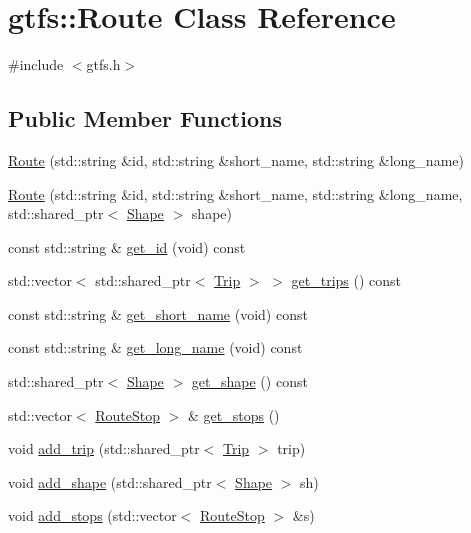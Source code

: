 \hypertarget{classgtfs_1_1Route}{}\section{gtfs\+:\+:Route Class Reference}
\label{classgtfs_1_1Route}


{\ttfamily \#include $<$gtfs.\+h$>$}

\subsection*{Public Member Functions}
\begin{DoxyCompactItemize}
\item 
\hyperlink{classgtfs_1_1Route_a32550fdfee780a26c596172184b86148}{Route} (std\+::string \&id, std\+::string \&short\+\_\+name, std\+::string \&long\+\_\+name)
\item 
\hyperlink{classgtfs_1_1Route_aa216efacee7f9eeab810e044894d3ec0}{Route} (std\+::string \&id, std\+::string \&short\+\_\+name, std\+::string \&long\+\_\+name, std\+::shared\+\_\+ptr$<$ \hyperlink{classgtfs_1_1Shape}{Shape} $>$ shape)
\item 
const std\+::string \& \hyperlink{classgtfs_1_1Route_a3f3f9bfc3a0aefbc96bc4488571e20f8}{get\+\_\+id} (void) const 
\item 
std\+::vector$<$ std\+::shared\+\_\+ptr$<$ \hyperlink{classgtfs_1_1Trip}{Trip} $>$ $>$ \hyperlink{classgtfs_1_1Route_a5ace58195fe71103e342e517fa1f92ca}{get\+\_\+trips} () const 
\item 
const std\+::string \& \hyperlink{classgtfs_1_1Route_a4834b2eb8f3221b435dead80ed9ec09b}{get\+\_\+short\+\_\+name} (void) const 
\item 
const std\+::string \& \hyperlink{classgtfs_1_1Route_adb91353a8a7d69027b252e67c529081d}{get\+\_\+long\+\_\+name} (void) const 
\item 
std\+::shared\+\_\+ptr$<$ \hyperlink{classgtfs_1_1Shape}{Shape} $>$ \hyperlink{classgtfs_1_1Route_a2112b5e3c590ace877fdffa8912e027d}{get\+\_\+shape} () const 
\item 
std\+::vector$<$ \hyperlink{structgtfs_1_1RouteStop}{Route\+Stop} $>$ \& \hyperlink{classgtfs_1_1Route_aa34e7c477efcde44cc03138cb9a0b8c8}{get\+\_\+stops} ()
\item 
void \hyperlink{classgtfs_1_1Route_aa8a666e5a8f197835764874c983e6601}{add\+\_\+trip} (std\+::shared\+\_\+ptr$<$ \hyperlink{classgtfs_1_1Trip}{Trip} $>$ trip)
\item 
void \hyperlink{classgtfs_1_1Route_acfa5b636369ce8d7d5e0e96b1f38fbe9}{add\+\_\+shape} (std\+::shared\+\_\+ptr$<$ \hyperlink{classgtfs_1_1Shape}{Shape} $>$ sh)
\item 
void \hyperlink{classgtfs_1_1Route_a8beb0325039a69e1d34e9dcc431e047e}{add\+\_\+stops} (std\+::vector$<$ \hyperlink{structgtfs_1_1RouteStop}{Route\+Stop} $>$ \&s)
\end{DoxyCompactItemize}


